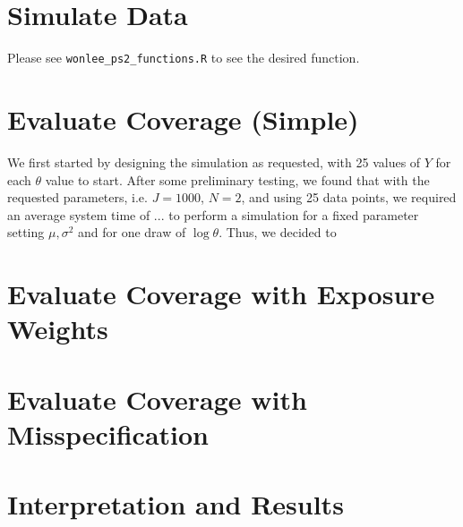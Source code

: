 \documentclass[psamsfonts]{amsart}
\theoremstyle{definition}
\theoremstyle{remark}
\numberwithin{equation}{section}
\begin{document}
\section{Simulate Data}

Please see \texttt{wonlee\_ps2\_functions.R} to see the desired function.

\section{Evaluate Coverage (Simple)}

We first started by designing the simulation as requested, with 25 values of $Y$ for each $\theta$ value to start. After some preliminary testing, we found that with the requested parameters, i.e. $J=1000$, $N=2$, and using 25 data points, we required an average system time of ... to perform a simulation for a fixed parameter setting $\mu, \sigma^2$ and for one draw of $\log \theta$. Thus, we decided to 

\section{Evaluate Coverage with Exposure Weights}

\section{Evaluate Coverage with Misspecification}

\section{Interpretation and Results}
\end{document}
